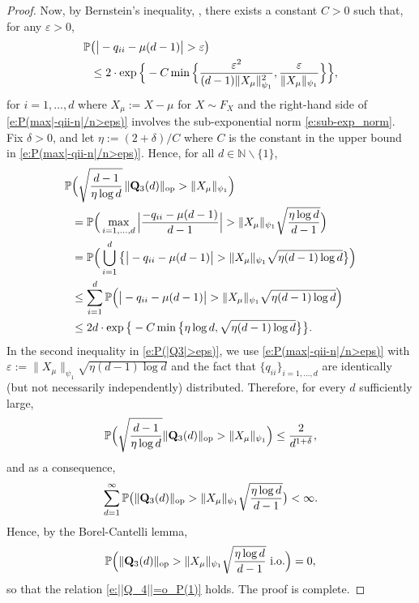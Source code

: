 \documentclass[9pt,twocolumn,twoside]{pnas-new}
\newcommand{\bbN}{{\mathbb N}}
\newcommand{\bbP}{{\mathbb P}}
\newcommand{\?}{\textbf{?}}
\newcommand{\op}{\textnormal{op}}
\newcommand{\GD}[1]{#1}
\newcommand{\QQ}{\mathbf{Q}}
\begin{document}
\begin{proof}
  Now, by Bernstein's inequality,
  \cite[p.\ 29, Theorem 2.8.1]{vershynin:2018}, there exists a
  constant $C > 0$ such that, for any $\varepsilon > 0$,
  \GD{\begin{align}
        \bbP&\big(\big|-q_{ii}-\mu(d-1)\big| > \varepsilon\big)\notag\\
            &\leq 2 \cdot \exp\Big\{ - C \min\Big\{
              \frac{\varepsilon^2}{(d-1)\|X_\mu\|^{2}_{\psi_1}},
              \frac{\varepsilon}{\|X_\mu\|_{\psi_1}} \Big\}\Big\},
    \label{e:P(max|-qii-n|/n>eps)}
\end{align}
for $i = 1, \ldots, d$ where $X_{\mu}:= X - \mu$ for $X \sim F_X$ and
the right-hand side of \eqref{e:P(max|-qii-n|/n>eps)} involves the
sub-exponential norm \eqref{e:sub-exp_norm}. Fix $\delta > 0$, and let
$\eta:= (2 + \delta)/C$ where $C$ is the constant in the upper
bound in \eqref{e:P(max|-qii-n|/n>eps)}. Hence, for all
$d \in \bbN \backslash \{1\}$,
\begin{align}\label{e:P(|Q3|>eps)}
  \bbP&\Big( \sqrt{\frac{d-1}{\eta \log d}}
        \hspace{0.5mm}\|\QQ_3(d)\|_{\op}
        > \|X_\mu\|_{\psi_1}\Big)\notag\\
      &= \bbP\Big(
        \max_{i=1,\hdots,d}\Big|\frac{-q_{ii}-\mu(d-1)}{d-1}\Big|
        > \|X_\mu\|_{\psi_1}\sqrt{\frac{\eta \log d}{d-1}}\Big) \notag\\
      &= \bbP\Big(\bigcup^{d}_{i=1}\big\{\big|-q_{ii}-\mu(d-1)\big|
        > \|X_\mu\|_{\psi_1}\sqrt{\eta (d-1)\log d}\big\}\Big) \notag \\ 
      &\leq \sum^{d}_{i=1}\bbP\Big(\big|-q_{ii}-\mu(d-1)\big|
        > \|X_\mu\|_{\psi_1}\sqrt{\eta (d-1)\log d}\Big) \notag \\
      & \leq  2d \cdot \exp\big\{ -  C \min\big\{ \eta  \log d ,
        \sqrt{ \eta (d-1) \log d } \big\}\big\}.
\end{align}}
In the second inequality in \eqref{e:P(|Q3|>eps)},
we use \eqref{e:P(max|-qii-n|/n>eps)} with
$\varepsilon := \|X_\mu\|_{\psi_1} \sqrt{\eta (d-1)\log d}$
and the fact that $\{q_{ii}\}_{i=1,\hdots,d}$ are identically
(but not necessarily independently) distributed. Therefore,
for every $d$ sufficiently large,
\begin{align*}
\bbP\Big( \sqrt{\frac{d-1}{\eta \log d}}\|\QQ_3(d)\|_{\op}
> \|X_\mu\|_{\psi_1}\Big)\leq  \frac{2}{d^{1 + \delta}},
\end{align*}
and as a consequence,
\begin{align*}
\sum^{\infty}_{d=1}\bbP\big(\|\QQ_3(d)\|_{\op} >
  \|X_\mu\|_{\psi_1}\sqrt{\frac{\eta \log d}{d-1}}\big)< \infty.
\end{align*}
Hence, by the Borel-Cantelli lemma,
\begin{align*}
  \bbP\Big(\|\QQ_3(d)\|_{\op} >
  \|X_\mu\|_{\psi_1}\sqrt{\frac{\eta \log d}{d-1}}
  \textnormal{ i.o.}\Big)  = 0,
\end{align*}
so that the relation \eqref{e:||Q_4||=o_P(1)} holds. The
proof is complete.
\end{proof}
\end{document}
